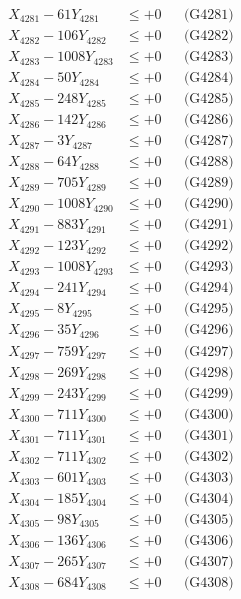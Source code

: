 \documentclass[a4paper,10pt]{article}
\begin{document}
{\begin{align}
\allowbreak
X_{4281} - 61Y_{4281} &\leq +0 && \text{(G4281)} \\
X_{4282} - 106Y_{4282} &\leq +0 && \text{(G4282)} \\
X_{4283} - 1008Y_{4283} &\leq +0 && \text{(G4283)} \\
X_{4284} - 50Y_{4284} &\leq +0 && \text{(G4284)} \\
X_{4285} - 248Y_{4285} &\leq +0 && \text{(G4285)} \\
X_{4286} - 142Y_{4286} &\leq +0 && \text{(G4286)} \\
X_{4287} - 3Y_{4287} &\leq +0 && \text{(G4287)} \\
X_{4288} - 64Y_{4288} &\leq +0 && \text{(G4288)} \\
X_{4289} - 705Y_{4289} &\leq +0 && \text{(G4289)} \\
X_{4290} - 1008Y_{4290} &\leq +0 && \text{(G4290)} \\
\allowbreak
X_{4291} - 883Y_{4291} &\leq +0 && \text{(G4291)} \\
X_{4292} - 123Y_{4292} &\leq +0 && \text{(G4292)} \\
X_{4293} - 1008Y_{4293} &\leq +0 && \text{(G4293)} \\
X_{4294} - 241Y_{4294} &\leq +0 && \text{(G4294)} \\
X_{4295} - 8Y_{4295} &\leq +0 && \text{(G4295)} \\
X_{4296} - 35Y_{4296} &\leq +0 && \text{(G4296)} \\
X_{4297} - 759Y_{4297} &\leq +0 && \text{(G4297)} \\
X_{4298} - 269Y_{4298} &\leq +0 && \text{(G4298)} \\
X_{4299} - 243Y_{4299} &\leq +0 && \text{(G4299)} \\
X_{4300} - 711Y_{4300} &\leq +0 && \text{(G4300)} \\
\allowbreak
X_{4301} - 711Y_{4301} &\leq +0 && \text{(G4301)} \\
X_{4302} - 711Y_{4302} &\leq +0 && \text{(G4302)} \\
X_{4303} - 601Y_{4303} &\leq +0 && \text{(G4303)} \\
X_{4304} - 185Y_{4304} &\leq +0 && \text{(G4304)} \\
X_{4305} - 98Y_{4305} &\leq +0 && \text{(G4305)} \\
X_{4306} - 136Y_{4306} &\leq +0 && \text{(G4306)} \\
X_{4307} - 265Y_{4307} &\leq +0 && \text{(G4307)} \\
X_{4308} - 684Y_{4308} &\leq +0 && \text{(G4308)} \\

\end{align}}
\end{document}
